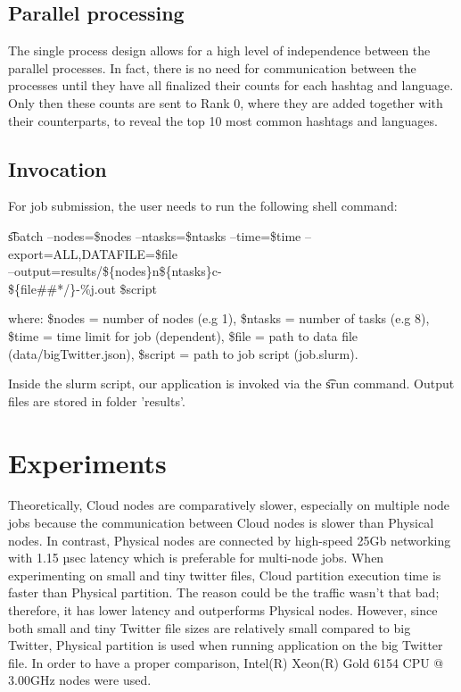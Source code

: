 \documentclass[11pt]{article}
\begin{document}
\subsection{Parallel processing}
The single process design allows for a high level of independence between the parallel processes. In fact, there is no need for communication between the processes until they have all finalized their counts for each hashtag and language. Only then these counts are sent to Rank 0, where they are added together with their counterparts, to reveal the top 10 most common hashtags and languages.

\subsection{Invocation}

For job submission, the user needs to run the following shell command:
\begin{flushleft}
\t sbatch --nodes=\$nodes --ntasks=\$ntasks --time=\$time --export=ALL,DATAFILE=\$file\\ --output=results/\$\{nodes\}n\$\{ntasks\}c-\\\$\{file\#\#*/\}-\%j.out \$script
\end{flushleft}
where: \$nodes = number of nodes (e.g 1), \$ntasks = number of tasks (e.g 8), \$time = time limit for job (dependent), \$file = path to data file (data/bigTwitter.json), \$script = path to job script (job.slurm).

Inside the slurm script, our application is invoked via the \t srun command. Output files are stored in folder 'results'.

\section{Experiments}

Theoretically, Cloud nodes are comparatively slower, especially on multiple node jobs because the communication between Cloud nodes is slower than Physical nodes. In contrast, Physical nodes are connected by high-speed 25Gb networking with 1.15 µsec latency which is preferable for multi-node jobs. When experimenting on small and tiny twitter files, Cloud partition execution time is faster than Physical partition. The reason could be the traffic wasn't that bad; therefore, it has lower latency and outperforms Physical nodes.  However, since both small and tiny Twitter file sizes are relatively small compared to big Twitter, Physical partition is used when running application on the big Twitter file. In order to have a proper comparison, Intel(R) Xeon(R) Gold 6154 CPU @ 3.00GHz nodes were used.
\end{document}

